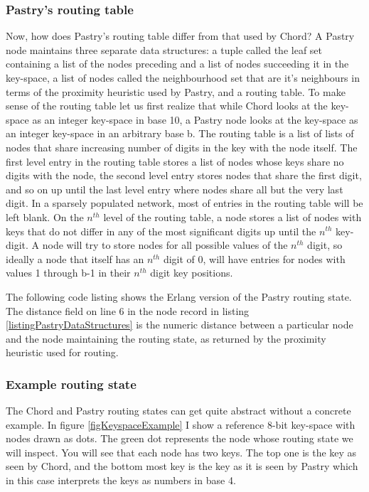 \subsubsection{Pastry's routing table}
Now, how does Pastry's routing table differ from that used by Chord?
A Pastry node maintains three separate data structures: a tuple called the leaf set containing a list of the nodes preceding and a list of nodes succeeding it in the key-space, a list of nodes called the neighbourhood set that are it's neighbours in terms of the proximity heuristic used by Pastry, and a routing table. 
To make sense of the routing table let us first realize that while Chord looks at the key-space as an integer key-space in base 10, a Pastry node looks at the key-space as an integer key-space in an arbitrary base b.
The routing table is a list of lists of nodes that share increasing number of digits in the key with the node itself. The first level entry in the routing table stores a list of nodes whose keys share no digits with the node, the second level entry stores nodes that share the first digit, and so on up until the last level entry where nodes share all but the very last digit.
In a sparsely populated network, most of entries in the routing table will be left blank.
On the $ n^{th} $ level of the routing table, a node stores a list of nodes with keys that do not differ in any of the most significant digits up until the $ n^{th} $ key-digit.
A node will try to store nodes for all possible values of the $ n^{th} $ digit, so ideally a node that itself has an $ n^{th} $ digit of 0, will have entries for nodes with values 1 through b-1 in their $ n^{th} $ digit key positions.

The following code listing shows the Erlang version of the Pastry routing state.
The distance field on line 6 in the node record in listing \ref{listingPastryDataStructures} is the numeric distance between a particular node and the node maintaining the routing state, as returned by the proximity heuristic used for routing.



\subsubsection{Example routing state}
The Chord and Pastry routing states can get quite abstract without a concrete example.
In figure \ref{figKeyspaceExample} I show a reference 8-bit key-space with nodes drawn as dots. The green dot represents the node whose routing state we will inspect. You will see that each node has two keys. The top one is the key as seen by Chord, and the bottom most key is the key as it is seen by Pastry which in this case interprets the keys as numbers in base 4.

